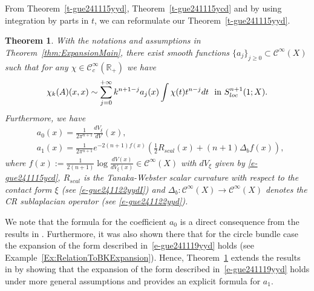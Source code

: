 \documentclass[12pt]{amsart}
\newtheorem{theorem}{Theorem}[section]
\theoremstyle{definition}
\theoremstyle{named}
\numberwithin{equation}{subsection}
\newcommand{\R}{\mathbb{R}}
\def\cC{\mathscr{C}}
\begin{document}
From Theorem~\ref{t-gue241115yyd}, Theorem~\ref{t-gue241115ycd} and by using integration by parts in $t$, we can reformulate our Theorem~\ref{t-gue241115yyd}.

\begin{theorem}\label{t-gue241119yyd}
With the notations and assumptions in Theorem~\ref{thm:ExpansionMain}, there exist smooth functions \(\{a_j\}_{j\geq 0}\subset \mathscr{C}^\infty(X)\)  
 such that for any \(\chi\in \mathscr{C}_c^\infty(\R_+)\) we have 
 \begin{equation}\label{e-gue241119yyd}
\chi_k(A)(x,x)\sim\sum^{+\infty}_{j=0}k^{n+1-j}a_j(x)\int\chi(t)t^{n-j}dt\ \ \mbox{in $S^{n+1}_{{\rm loc\,}}(1;X)$}.
 \end{equation}
 Furthermore, we have 
 \begin{equation}
 \begin{split}
 &a_0(x)=\frac{1}{2\pi ^{n+1}}
\frac{dV_{\xi}}{dV}(x),\\
&a_1(x)=\frac{1}{2\pi^{n+1}}e^{-2(n+1)f(x)}\left(\frac{1}{2}R_{scal}(x)+(n+1)\Delta_b f(x)\right),
\end{split}
\end{equation}
where $f(x):=\frac{1}{2(n+1)}\log \frac{dV(x)}{dV_\xi(x)}\in\cC^\infty(X)$ with \(dV_\xi\) given by \eqref{e-gue241115ycd}, $R_{scal}$ is the Tanaka-Webster scalar curvature with respect to the contact form $\xi$ (see \eqref{e-gue241122yydI}) and $\Delta_b:\cC^{\infty}(X)\rightarrow\cC^{\infty}(X)$ denotes the CR sublaplacian operator (see \eqref{e-gue241122yyd}). 
\end{theorem}
We note that the formula for the coefficient \(a_0\) is a direct consequence from the results in \cite{HHMS23}. Furthermore, it was also shown there that for the circle bundle case the expansion of the form described in~\eqref{e-gue241119yyd} holds (see Example~\ref{Ex:RelationToBKExpansion}). Hence, Theorem~\ref{t-gue241119yyd} extends the results in \cite{HHMS23} by showing that the expansion of the form described in~\eqref{e-gue241119yyd} holds under more general assumptions and provides an explicit formula for \(a_1\). 
\end{document}
